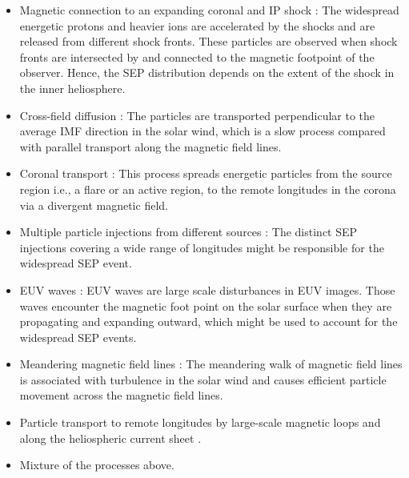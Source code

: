 \begin{itemize}
    \item Magnetic connection to an expanding coronal and IP shock \citep{Cliver1995ICRC, Torsti1999JGR, Reames1999, cane2003two, Richardson2014SoPh, Kouloumvakos2019ApJ}: 
    The widespread energetic protons and heavier ions are accelerated by the shocks and are released from different shock fronts. These particles are observed when shock fronts are intersected by and connected to the magnetic footpoint of the observer. Hence, the \ac{SEP} distribution depends on the extent of the shock in the inner heliosphere.

    \item Cross-field diffusion \citep{Dresing2012SoPh}: The particles are transported perpendicular to the average IMF direction in the solar wind, which is a slow process compared with parallel transport along the magnetic field lines.
    
    \item Coronal transport \citep{Reinhard1974SoPh, Newkirk1978JGR}: This process spreads energetic particles from the source region i.e., a flare or an active region, to the remote longitudes in the corona via a divergent magnetic field. 

    \item Multiple particle injections from different sources \citep{Dresing2023The17}: The distinct \ac{SEP} injections covering a wide range of longitudes might be responsible for the widespread \ac{SEP} event.

    \item \ac{EUV} waves \citep{Rouillard2012ApJ, Park2013ApJ}: \ac{EUV} waves are large scale disturbances in \ac{EUV} images. Those waves encounter the magnetic foot point on the solar surface when they are propagating and expanding outward, which might be used to account for the widespread \ac{SEP} events.
    
    \item Meandering magnetic field lines \citep{Laitinen2016AA, Laitinen2023ApJL}: The meandering walk of magnetic field lines is associated with turbulence in the solar wind and causes efficient particle movement across the magnetic field lines.
    \item Particle transport to remote longitudes by large-scale magnetic loops \citep{Klassen2018AA, Schrijver2013ApJ} and along the heliospheric current sheet \citep{Battarbee2018ApJ}.
    \item Mixture of the processes above.
\end{itemize}

